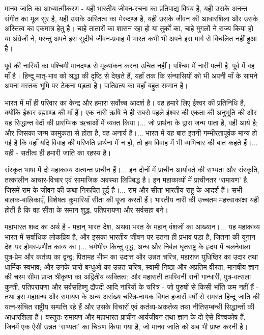 मानव जाति का आध्यात्मीकरण - यही भारतीय जीवन-रचना का प्रतिपाद्य विषय है, यही उसके अनन्त संगीत का मूल सुर है, यही उसके अस्तित्व का मेरुदण्ड है, यही उसके जीवन की आधारशिला और उसके अस्तित्व का एकमात्र हेतु है। चाहे तातारों का शासन रहा हो या तुर्कों का, चाहे मुगलों ने राज्य किया हो या अंग्रेजों ने, परन्तु अपने इस सुदीर्घ जीवन-प्रवाह में भारत कभी भी अपने इस मार्ग से विचलित नहीं हुआ है। 

पूर्व की नारियों का पश्चिमी मानदण्ड से मूल्यांकन करना उचित नहीं। पश्चिम में नारी पत्नी है, पूर्व में वह माँ है। हिन्दू मातृ-भाव को श्रद्धा की दृष्टि से देखते हैं, यहाँ तक कि संन्यासियों को भी अपनी माँ के सामने अपना मस्तक भूमि पर टेकना पड़ता है। पातिव्रत्य का यहाँ बहुत सम्मान है। 

भारत में माँ ही परिवार का केन्द्र और हमारा सर्वोच्च आदर्श है। वह हमारे लिए ईश्वर की प्रतिनिधि है, क्योंकि ईश्वर ब्रह्माण्ड की माँ हैं। एक नारी ऋषि ने ही सबसे पहले ईश्वर की एकता की अनुभूति की और यह सिद्धान्त वेदों की प्रारम्भिक ऋचाओं में व्यक्त किया।... जो प्रार्थना के द्वारा जन्म पाता है, वही आर्य है; और जिसका जन्म कामुकता से होता है, वह अनार्य है।... भारत में यह बात इतनी गम्भीरतापूर्वक मान्य हो गई है कि वहाँ यदि विवाह की परिणति प्रार्थना में न हो, तो हम विवाह में भी व्यभिचार की बात कहते हैं।... यही - सतीत्व ही हमारी जाति का रहस्य है। 

संस्कृत भाषा में दो महाकाव्य अत्यन्त प्राचीन हैं।... इन दोनों में प्राचीन आर्यावर्त की सभ्यता और संस्कृति, तत्कालीन आचार-विचार एवं सामाजिक अवस्था लिपिबद्ध है। इन महाकाव्यों में प्राचीनतर ‘रामायण’ है, जिसमें राम के जीवन की कथा निरूपित हुई है।... राम और सीता भारतीय राष्ट्र के आदर्श हैं। सभी बालक-बालिकाएँ, विशेषतः कुमारियाँ सीता की पूजा करती हैं। भारतीय नारी की उच्चतम महत्त्वाकांक्षा यही होती है कि वह सीता के समान शुद्ध, पतिपरायणा और सर्वसहा बने। 

महाभारत शब्द का अर्थ है - महान् भारत देश, अथवा भरत के महान् वंशजों का आख्यान।... यह महाकाव्य भारत में सर्वाधिक लोकप्रिय है, और इसका भारतीय जीवन पर उतना ही प्रभाव पड़ा है, जितना की यूनान देश पर होमर-प्रणीत काव्य का।... धर्मभीरु किन्तु वृद्ध, अन्ध और निर्बल धृतराष्ट्र के हृदय में चलनेवाला पुत्र-प्रेम और कर्तव्य का द्वन्द्व; पितामह भीष्म का उदात्त और उन्नत चरित्र, महाराज युधिष्ठिर का उदार तथा धार्मिक स्वभाव; और उनके चारों बन्धुओं का उन्नत चरित्र, स्वामी-निष्ठा और अप्रतिम वीरता; मानवीय ज्ञान की चरम सीमा प्राप्त श्रीकृष्ण का अद्वितीय व्यक्तित्व; और महासती तपस्विनी रानी गान्धारी, पुत्र-वत्सला कुन्ती, पतिपरायणा और सर्वसहिष्णु द्रौपदी आदि नारियों के चरित्र - जो पुरुषों से किसी भाँति कम नहीं हैं - तथा इस महाग्रन्थ और रामायण के अन्य असंख्य चरित्र-नायक विगत हजारों वर्षों से समस्त हिन्दू जाति की यत्न-संचित राष्ट्रीय सम्पत्ति रहे हैं और उसके विचारों एवं कर्तव्य-अकर्तव्य तथा नीतिसम्बन्धी सिद्धान्तों की आधारशिला हैं। वस्तुतः रामायण और महाभारत प्राचीन आर्यजीवन तथा ज्ञान के दो ऐसे विश्वकोष हैं, जिनमें एक ऐसी उन्नत ‘सभ्यता’ का चित्रण किया गया है, जो मानव जाति को अब भी प्राप्त करनी है। 

